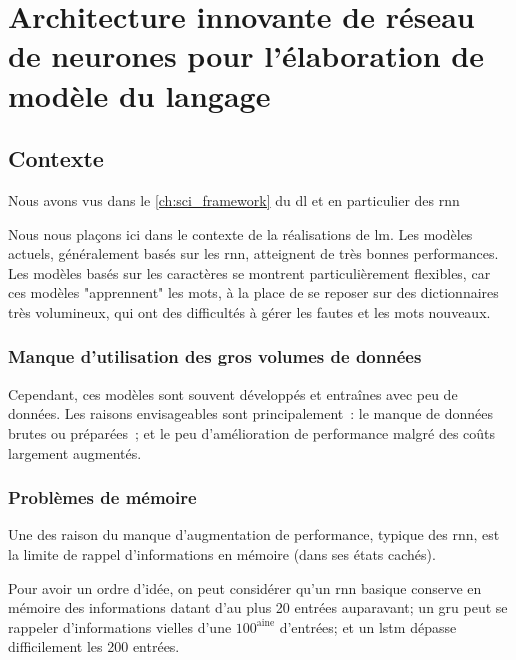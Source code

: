 
\chapter{Architecture innovante de réseau de neurones pour l'élaboration de modèle du langage\label{ch:project_gmsnn}}
\section{Contexte}
Nous avons vus dans le \autoref{ch:sci_framework} du \gls{dl} et en particulier des \gls{rnn} %

Nous nous plaçons ici dans le contexte de la réalisations de \gls{lm}.
Les modèles actuels, généralement basés sur les \gls{rnn}, atteignent de très bonnes performances. %
Les modèles basés sur les caractères se montrent particulièrement flexibles, car ces modèles "apprennent" les mots, à la place de se reposer sur des dictionnaires très volumineux, qui ont des difficultés à gérer les fautes et les mots nouveaux.

\subsection{Manque d'utilisation des gros volumes de données}
Cependant, ces modèles sont souvent développés et entraînes avec peu de données.
Les raisons envisageables sont principalement~: le manque de données brutes ou préparées~; et le peu d'amélioration de performance malgré des coûts largement augmentés.

\subsection{Problèmes de mémoire}\label{subsec:mempb}
Une des raison du manque d'augmentation de performance, typique des \gls{rnn}, est la limite de rappel d'informations en \og mémoire\fg{} (dans ses états cachés).

Pour avoir un ordre d'idée, on peut considérer qu'un \gls{rnn} basique conserve en mémoire des informations datant d'au plus 20 entrées auparavant; un \gls{gru} peut se rappeler d'informations vielles d'une $100^\text{aine}$ d'entrées; et un \gls{lstm} dépasse difficilement les 200 entrées.

